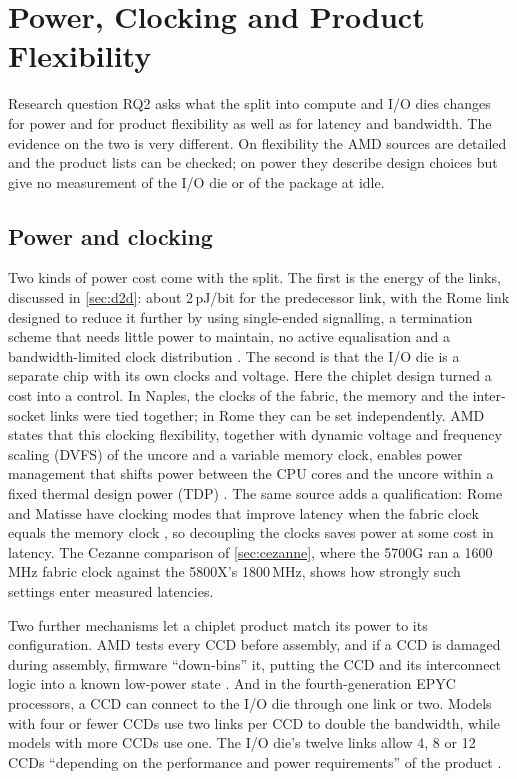 

\section{Power, Clocking and Product Flexibility}
\label{sec:power-flexibility}
Research question RQ2 asks what the split into compute and I/O dies changes for power and for product flexibility as well as for latency and bandwidth. The evidence on the two is very different. On flexibility the AMD sources are detailed and the product lists can be checked; on power they describe design choices but give no measurement of the I/O die or of the package at idle.

\subsection{Power and clocking}
\label{sec:chiplet-power}
Two kinds of power cost come with the split. The first is the energy of the links, discussed in \cref{sec:d2d}: about 2\,pJ/bit for the predecessor link, with the Rome link designed to reduce it further by using single-ended signalling, a termination scheme that needs little power to maintain, no active equalisation and a bandwidth-limited clock distribution \cite{naffziger2020chiplet}. The second is that the I/O die is a separate chip with its own clocks and voltage. Here the chiplet design turned a cost into a control. In Naples, the clocks of the fabric, the memory and the inter-socket links were tied together; in Rome they can be set independently. AMD states that this clocking flexibility, together with dynamic voltage and frequency scaling (DVFS) of the uncore and a variable memory clock, enables power management that shifts power between the CPU cores and the uncore within a fixed thermal design power (TDP) \cite{naffziger2020chiplet}. The same source adds a qualification: Rome and Matisse have clocking modes that improve latency when the fabric clock equals the memory clock \cite{naffziger2020chiplet}, so decoupling the clocks saves power at some cost in latency. The Cezanne comparison of \cref{sec:cezanne}, where the 5700G ran a 1600\,MHz fabric clock against the 5800X's 1800\,MHz, shows how strongly such settings enter measured latencies.

Two further mechanisms let a chiplet product match its power to its configuration. AMD tests every CCD before assembly, and if a CCD is damaged during assembly, firmware ``down-bins'' it, putting the CCD and its interconnect logic into a known low-power state \cite{naffziger2020chiplet}. And in the fourth-generation EPYC processors, a CCD can connect to the I/O die through one link or two. Models with four or fewer CCDs use two links per CCD to double the bandwidth, while models with more CCDs use one. The I/O die's twelve links allow 4, 8 or 12 CCDs ``depending on the performance and power requirements'' of the product \cite{advancedmicrodevicesinc.4thGenAMD2023}.

